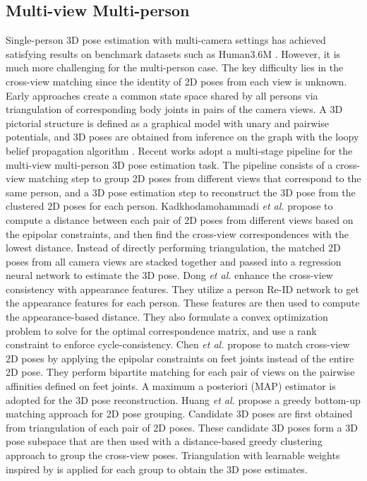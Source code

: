 \documentclass[final]{cvpr}
\begin{document}
\subsection{Multi-view Multi-person}

Single-person 3D pose estimation with multi-camera settings has achieved satisfying results on benchmark datasets such as Human3.6M \cite{ionescu2013human3}.
However, it is much more challenging for the multi-person case.
The key difficulty lies in the cross-view matching since the identity of 2D poses from each view is unknown.
Early approaches \cite{belagiannis20143d,belagiannis20153d,ershadi2018multiple} create a common state space shared by all persons via triangulation of corresponding body joints in pairs of the camera views. A 3D pictorial structure is defined as a graphical model with unary and pairwise potentials, and 3D poses are obtained from inference on the graph with the loopy belief propagation algorithm \cite{bishop2006pattern}.
Recent works \cite{kadkhodamohammadi2020generalizable,dong2019fast,chen2020multi,huang2020end} adopt a multi-stage pipeline for the multi-view multi-person 3D pose estimation task.
The pipeline consists of a cross-view matching step to group 2D poses from different views that correspond to the same person, and a 3D pose estimation step to reconstruct the 3D pose from the clustered 2D poses for each person.
Kadkhodamohammadi \textit{et al.} \cite{kadkhodamohammadi2020generalizable} propose to compute a distance between each pair of 2D poses from different views based on the epipolar constraints, and then find the cross-view correspondences with the lowest distance. Instead of directly performing triangulation, the matched 2D poses from all camera views are stacked together and passed into a regression neural network to estimate the 3D pose.
Dong \textit{et al.} \cite{dong2019fast} enhance the cross-view consistency with appearance features. They utilize a person Re-ID network \cite{zhong2018camera} to get the appearance features for each person. These features are then used to compute the appearance-based distance. They also formulate a convex optimization problem to solve for the optimal correspondence matrix, and use a rank constraint to enforce cycle-consistency.
Chen \textit{et al.} \cite{chen2020multi} propose to match cross-view 2D poses by applying the epipolar constraints on feet joints instead of the entire 2D pose. They perform bipartite matching for each pair of views on the pairwise affinities defined on feet joints. A maximum a posteriori (MAP) estimator is adopted for the 3D pose reconstruction.
Huang \textit{et al.} \cite{huang2020end} propose a greedy bottom-up matching approach for 2D pose grouping. Candidate 3D poses are first obtained from triangulation of each pair of 2D poses. These candidate 3D poses form a 3D pose subspace that are then used with a distance-based greedy clustering approach to group the cross-view poses.
Triangulation with learnable weights inspired by \cite{iskakov2019learnable} is applied for each group to obtain the 3D pose estimates.
\end{document}
